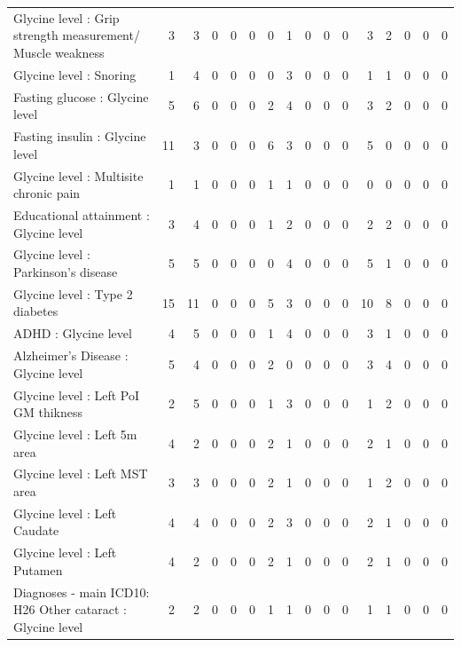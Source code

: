 \begin{table}[ht]
\begin{tabular}{lrrrrrrrrrrrrrrr}
  Glycine level  : Grip strength measurement/ Muscle weakness &   3 &   3 &   0 &   0 &   0 &   0 &   1 &   0 &   0 &   0 &   3 &   2 &   0 &   0 &   0 \\ 
  Glycine level  : Snoring &   1 &   4 &   0 &   0 &   0 &   0 &   3 &   0 &   0 &   0 &   1 &   1 &   0 &   0 &   0 \\ 
  Fasting glucose : Glycine level  &   5 &   6 &   0 &   0 &   0 &   2 &   4 &   0 &   0 &   0 &   3 &   2 &   0 &   0 &   0 \\ 
  Fasting insulin : Glycine level  &  11 &   3 &   0 &   0 &   0 &   6 &   3 &   0 &   0 &   0 &   5 &   0 &   0 &   0 &   0 \\ 
  Glycine level  : Multisite chronic pain &   1 &   1 &   0 &   0 &   0 &   1 &   1 &   0 &   0 &   0 &   0 &   0 &   0 &   0 &   0 \\ 
  Educational attainment : Glycine level  &   3 &   4 &   0 &   0 &   0 &   1 &   2 &   0 &   0 &   0 &   2 &   2 &   0 &   0 &   0 \\ 
  Glycine level  : Parkinson's disease &   5 &   5 &   0 &   0 &   0 &   0 &   4 &   0 &   0 &   0 &   5 &   1 &   0 &   0 &   0 \\ 
  Glycine level  : Type 2 diabetes &  15 &  11 &   0 &   0 &   0 &   5 &   3 &   0 &   0 &   0 &  10 &   8 &   0 &   0 &   0 \\ 
  ADHD : Glycine level  &   4 &   5 &   0 &   0 &   0 &   1 &   4 &   0 &   0 &   0 &   3 &   1 &   0 &   0 &   0 \\ 
  Alzheimer's Disease : Glycine level  &   5 &   4 &   0 &   0 &   0 &   2 &   0 &   0 &   0 &   0 &   3 &   4 &   0 &   0 &   0 \\ 
  Glycine level  : Left PoI GM thikness &   2 &   5 &   0 &   0 &   0 &   1 &   3 &   0 &   0 &   0 &   1 &   2 &   0 &   0 &   0 \\ 
  Glycine level  : Left 5m area &   4 &   2 &   0 &   0 &   0 &   2 &   1 &   0 &   0 &   0 &   2 &   1 &   0 &   0 &   0 \\ 
  Glycine level  : Left MST area &   3 &   3 &   0 &   0 &   0 &   2 &   1 &   0 &   0 &   0 &   1 &   2 &   0 &   0 &   0 \\ 
  Glycine level  : Left Caudate &   4 &   4 &   0 &   0 &   0 &   2 &   3 &   0 &   0 &   0 &   2 &   1 &   0 &   0 &   0 \\ 
  Glycine level  : Left Putamen &   4 &   2 &   0 &   0 &   0 &   2 &   1 &   0 &   0 &   0 &   2 &   1 &   0 &   0 &   0 \\ 
  Diagnoses - main ICD10: H26 Other cataract : Glycine level  &   2 &   2 &   0 &   0 &   0 &   1 &   1 &   0 &   0 &   0 &   1 &   1 &   0 &   0 &   0 \\ 

\end{tabular}
\end{table}
